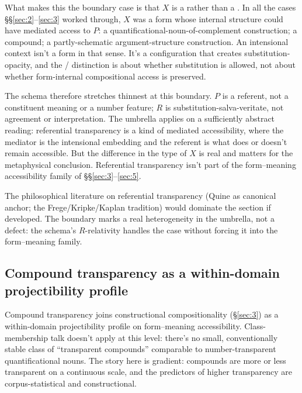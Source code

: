 What makes this the boundary case is that $X$ is a  rather than a . In all the cases §§\ref{sec:2}--\ref{sec:3} worked through, $X$ was a form whose internal structure could have mediated access to $P$: a quantificational-noun-of-complement construction; a compound; a partly-schematic argument-structure construction. An intensional context isn't a form in that sense. It's a configuration that creates substitution-opacity, and the / distinction is about whether substitution is allowed, not about whether form-internal compositional access is preserved.

The schema therefore stretches thinnest at this boundary. $P$ is a referent, not a constituent meaning or a number feature; $R$ is substitution-salva-veritate, not agreement or interpretation. The umbrella applies on a sufficiently abstract reading: referential transparency is a kind of mediated accessibility, where the mediator is the intensional embedding and the referent is what does or doesn't remain accessible. But the difference in the type of $X$ is real and matters for the metaphysical conclusion. Referential transparency isn't part of the form--meaning accessibility family of §§\ref{sec:3}--\ref{sec:5}.

The philosophical literature on referential transparency (Quine \autocite*{quine-1956-quantifiers-propositional-attitudes} as canonical anchor; the Frege/Kripke/Kaplan tradition) would dominate the section if developed. The boundary marks a real heterogeneity in the umbrella, not a defect: the schema's $R$-relativity handles the case without forcing it into the form--meaning family.

\subsection{Compound transparency as a within-domain projectibility profile}

Compound transparency joins constructional compositionality (§\ref{sec:3}) as a within-domain projectibility profile on form--meaning accessibility. Class-membership talk doesn't apply at this level: there's no small, conventionally stable class of \enquote{transparent compounds} comparable to number-transparent quantificational nouns. The story here is gradient: compounds are more or less transparent on a continuous scale, and the predictors of higher transparency are corpus-statistical and constructional.

